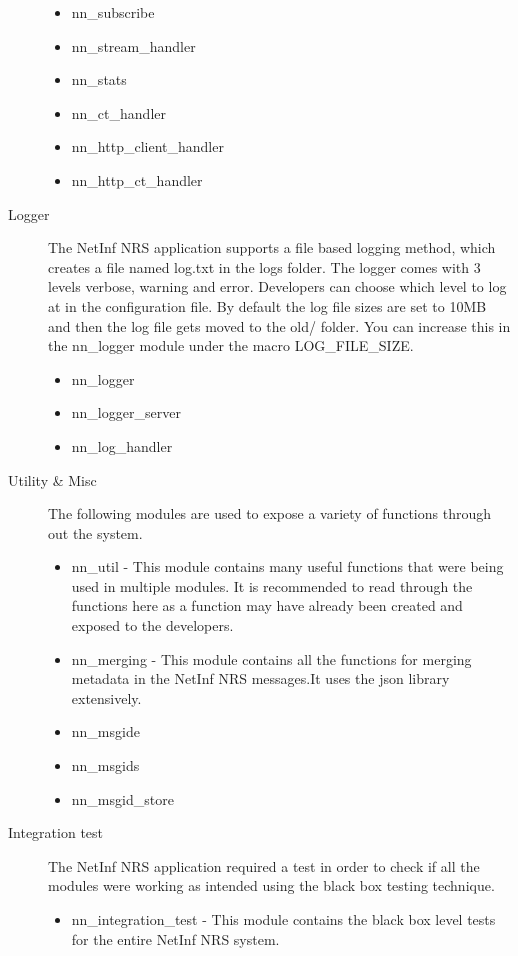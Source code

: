 \begin{description}
\begin{itemize}
\item nn\_subscribe
\item nn\_stream\_handler
\item nn\_stats
\item nn\_ct\_handler
\item nn\_http\_client\_handler
\item nn\_http\_ct\_handler
\end{itemize}

\item[Logger]
The NetInf NRS application supports a file based logging method, which creates a file named log.txt in the logs folder. The logger comes with 3 levels verbose, warning and error. Developers can choose which level to log at in the configuration file. By default the log file sizes are set to 10MB and then the log file gets moved to the old/ folder. You can increase this in the nn\_logger module under the macro LOG\_FILE\_SIZE.
\begin{itemize}
\item nn\_logger
\item nn\_logger\_server
\item nn\_log\_handler
\end{itemize}
\item [Utility \& Misc]
The following modules are used to expose a variety of functions through out the system.
\begin{itemize}
\item nn\_util - This module contains many useful functions that were being used in multiple modules. It is recommended to read through the functions here as a function may have already been created and exposed to the developers.
\item nn\_merging - This module contains all the functions for merging metadata in the NetInf NRS messages.It uses the json library extensively.
\item nn\_msgide
\item nn\_msgids
\item nn\_msgid\_store
\end {itemize}
\item [Integration test]
The NetInf NRS application required a test in order to check if all the modules were working as intended using the black box testing technique. 
\begin{itemize}
\item nn\_integration\_test - This module contains the black box level tests for the entire NetInf NRS system.
\end{itemize}


\end{description}

